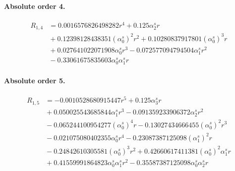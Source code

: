 \documentclass[10pt]{article}
\begin{document}
\paragraph{Absolute order 4.}
\begin{align*}
R_{1,4} &= 0.0016576826498282 r^{4} + 0.125 \alpha_{2}^s r \\
&{}  + 0.12398128438351 \left(\alpha_{0}^s\right)^{2} r^{2} + 0.10280837917801 \left(\alpha_{0}^s\right)^{3} r \\
&{}  + 0.027641022071908 \alpha_{0}^s r^{3} - 0.072577094794504 \alpha_{1}^s r^{2} \\
&{}  - 0.33061675835603 \alpha_{0}^s \alpha_{1}^s r
\end{align*}

\paragraph{Absolute order 5.}
\begin{align*}
R_{1,5} &=  - 0.0010528680915447 r^{5} + 0.125 \alpha_{3}^s r \\
&{}  + 0.050025543685844 \alpha_{1}^s r^{3} - 0.091359233906372 \alpha_{2}^s r^{2} \\
&{}  - 0.065244100954277 \left(\alpha_{0}^s\right)^{4} r - 0.13027434666455 \left(\alpha_{0}^s\right)^{2} r^{3} \\
&{}  - 0.021075080402355 \alpha_{0}^s r^{4} - 0.23087387125098 \left(\alpha_{1}^s\right)^{2} r \\
&{}  - 0.24842610305581 \left(\alpha_{0}^s\right)^{3} r^{2} + 0.42660617411381 \left(\alpha_{0}^s\right)^{2} \alpha_{1}^s r \\
&{}  + 0.41559991864823 \alpha_{0}^s \alpha_{1}^s r^{2} - 0.35587387125098 \alpha_{0}^s \alpha_{2}^s r
\end{align*}
\end{document}
